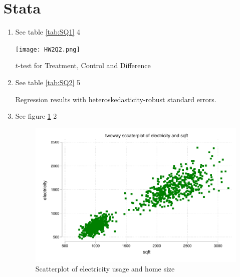 \documentclass{article}
\begin{document}
\section{Stata}
\begin{enumerate}
    \item 
    
\noindent See table \ref{tab:SQ1} 4
\vspace{0.5cm}
\begin{table}[h]
    \centering
     \texttt{[image: HW2Q2.png]}
    \caption{\(t\)-test for Treatment, Control and Difference}
    \label{tab:SQ1}
\end{table}

\item
\noindent See table \ref{tab:SQ2} 5 
\vspace{0.5cm}
\begin{table}[]
    \centering
    
    \caption{Regression results with heteroskedasticity-robust standard errors.}
    \label{tab:SQ2}
\end{table}

\item
\noindent See figure \ref{fig:SQ3} 2 
\vspace{0.5cm}
\begin{figure}[]
    \centering
    \includegraphics{HW2Q2.pdf}
    \caption{Scatterplot of electricity usage and home size}
    \label{fig:SQ3}
\end{figure}
\end{enumerate}
\end{document}

